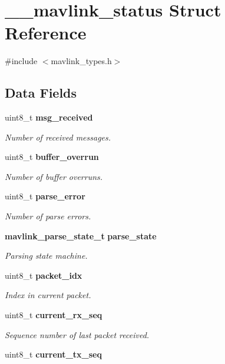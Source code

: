\section{\+\_\+\+\_\+mavlink\+\_\+status Struct Reference}
\label{struct____mavlink__status}


{\ttfamily \#include $<$mavlink\+\_\+types.\+h$>$}

\subsection*{Data Fields}
\begin{DoxyCompactItemize}
\item 
uint8\+\_\+t \textbf{ msg\+\_\+received}
\begin{DoxyCompactList}\small\item\em Number of received messages. \end{DoxyCompactList}\item 
uint8\+\_\+t \textbf{ buffer\+\_\+overrun}
\begin{DoxyCompactList}\small\item\em Number of buffer overruns. \end{DoxyCompactList}\item 
uint8\+\_\+t \textbf{ parse\+\_\+error}
\begin{DoxyCompactList}\small\item\em Number of parse errors. \end{DoxyCompactList}\item 
\textbf{ mavlink\+\_\+parse\+\_\+state\+\_\+t} \textbf{ parse\+\_\+state}
\begin{DoxyCompactList}\small\item\em Parsing state machine. \end{DoxyCompactList}\item 
uint8\+\_\+t \textbf{ packet\+\_\+idx}
\begin{DoxyCompactList}\small\item\em Index in current packet. \end{DoxyCompactList}\item 
uint8\+\_\+t \textbf{ current\+\_\+rx\+\_\+seq}
\begin{DoxyCompactList}\small\item\em Sequence number of last packet received. \end{DoxyCompactList}\item 
uint8\+\_\+t \textbf{ current\+\_\+tx\+\_\+seq}

\end{DoxyCompactItemize}
